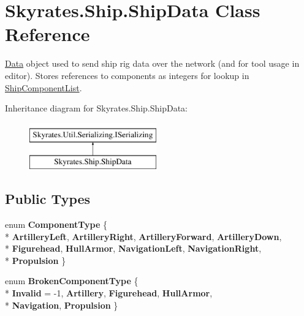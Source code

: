 \hypertarget{class_skyrates_1_1_ship_1_1_ship_data}{\section{Skyrates.\-Ship.\-Ship\-Data Class Reference}
\label{class_skyrates_1_1_ship_1_1_ship_data}
}


\hyperlink{namespace_skyrates_1_1_data}{Data} object used to send ship rig data over the network (and for tool usage in editor). Stores references to components as integers for lookup in \hyperlink{class_skyrates_1_1_ship_1_1_ship_component_list}{Ship\-Component\-List}.  


Inheritance diagram for Skyrates.\-Ship.\-Ship\-Data\-:\begin{figure}[H]
\begin{center}
\leavevmode
\includegraphics[height=2.000000cm]{class_skyrates_1_1_ship_1_1_ship_data}
\end{center}
\end{figure}
\subsection*{Public Types}
\begin{DoxyCompactItemize}
\item 
enum {\bfseries Component\-Type} \{ \\*
{\bfseries Artillery\-Left}, 
{\bfseries Artillery\-Right}, 
{\bfseries Artillery\-Forward}, 
{\bfseries Artillery\-Down}, 
\\*
{\bfseries Figurehead}, 
{\bfseries Hull\-Armor}, 
{\bfseries Navigation\-Left}, 
{\bfseries Navigation\-Right}, 
\\*
{\bfseries Propulsion}
 \}
\item 
enum {\bfseries Broken\-Component\-Type} \{ \\*
{\bfseries Invalid} = -\/1, 
{\bfseries Artillery}, 
{\bfseries Figurehead}, 
{\bfseries Hull\-Armor}, 
\\*
{\bfseries Navigation}, 
{\bfseries Propulsion}
 \}
\end{DoxyCompactItemize}
